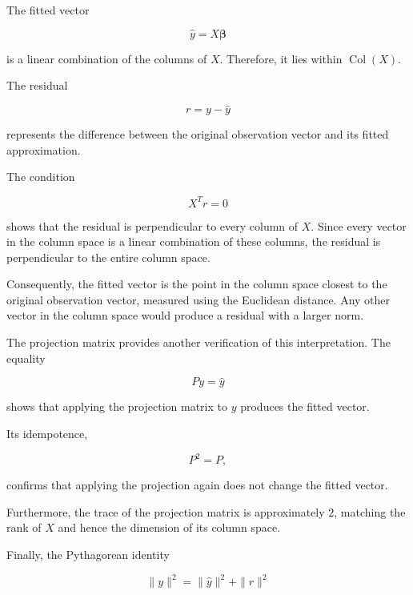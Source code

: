 \documentclass[12pt,a4paper]{article}
\numberwithin{equation}{section}
\begin{document}
The fitted vector

\begin{equation}
\hat{y}=X\boldsymbol{\beta}
\end{equation}

is a linear combination of the columns of $X$.
Therefore, it lies within $\operatorname{Col}(X)$.

The residual

\begin{equation}
r=y-\hat{y}
\end{equation}

represents the difference between the original
observation vector and its fitted approximation.

The condition

\begin{equation}
X^Tr=0
\end{equation}

shows that the residual is perpendicular to
every column of $X$. Since every vector in
the column space is a linear combination of
these columns, the residual is perpendicular
to the entire column space.

Consequently, the fitted vector is the point
in the column space closest to the original
observation vector, measured using the
Euclidean distance. Any other vector in the
column space would produce a residual with
a larger norm.

The projection matrix provides another
verification of this interpretation. The equality

\begin{equation}
Py=\hat{y}
\end{equation}

shows that applying the projection matrix
to $y$ produces the fitted vector.

Its idempotence,

\begin{equation}
P^2=P,
\end{equation}

confirms that applying the projection again
does not change the fitted vector.

Furthermore, the trace of the projection matrix
is approximately $2$, matching the rank of $X$
and hence the dimension of its column space.

Finally, the Pythagorean identity

\begin{equation}
\|y\|^2=
\|\hat{y}\|^2+\|r\|^2
\end{equation}
\end{document}
